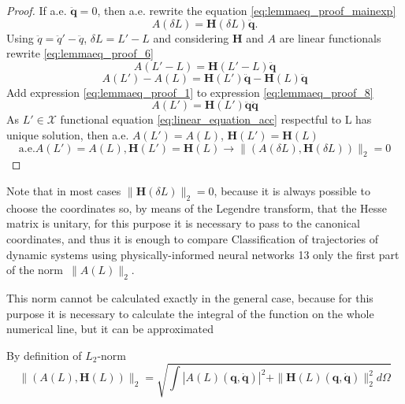 \documentclass[sn-mathphys-num]{sn-jnl}
\theoremstyle{thmstylethree}
\theoremstyle{thmstyletwo}
\theoremstyle{thmstyleone}
\begin{document}
\begin{proof}
If a.e. $\ddot{\mathbf{q}} = 0$, then a.e. rewrite the equation \ref{eq:lemmaeq_proof_mainexp}
\begin{equation}
\label{eq:lemmaeq_proof_6}
A(\delta L) = \mathbf{H}(\delta L)\ddot{\mathbf{q}}.
\end{equation}
Using $\ddot{q} = \ddot{q}' - \ddot{q}$, $\delta L = L' - L$ and considering $\mathbf{H}$ and $A$ are linear functionals rewrite \ref{eq:lemmaeq_proof_6}
\begin{equation}
\label{eq:lemmaeq_proof_7}
A(L' - L) = \mathbf{H}(L' - L)\ddot{\mathbf{q}}
\end{equation}
\begin{equation}
\label{eq:lemmaeq_proof_8}
A(L') - A(L) = \mathbf{H}(L')\ddot{\mathbf{q}} -\mathbf{H}(L)\ddot{\mathbf{q}}
\end{equation}
Add expression \ref{eq:lemmaeq_proof_1} to expression
\ref{eq:lemmaeq_proof_8}
\begin{equation}
\label{eq:lemmaeq_proof_9}
A(L') = \mathbf{H}(L')\ddot{\mathbf{q}}\ddot{\mathbf{q}}
\end{equation}
As $L' \in \mathcal{X}$ functional equation \ref{eq:linear_equation_acc} respectful to L has unique solution, then a.e. $A(L') = A(L)$, $\mathbf{H}(L') = \mathbf{H}(L)$
\begin{equation}
\label{eq:lemmaeq_proof_9}
\text{a.e.} A(L') = A(L), \mathbf{H}(L') = \mathbf{H}(L) \rightarrow \|(A(\delta L), \mathbf{H}(\delta L))\|_2 = 0
\end{equation}

\end{proof}

Note that in most cases $\|\mathbf{H}(\delta L)\|_2 = 0$, because it is always possible to choose the
coordinates so, by means of the Legendre transform, that the Hesse matrix is unitary, for this
purpose it is necessary to pass to the canonical coordinates, and thus it is enough to compare
Classification of trajectories of dynamic systems using physically-informed neural networks 13
only the first part of the norm~$\|A(L)\|_2$.

This norm cannot be calculated exactly in the general case, because for this purpose it is
necessary to calculate the integral of the function on the whole numerical line, but it can be
approximated

By definition of $L_2$-norm
\begin{equation}
\label{eq:l2_norm_approx_1}
\|(A(L), \mathbf{H}(L))\|_2 = \sqrt{\int |A(L)\left(\mathbf{q}, \dot{\mathbf{q}}\right)|^2 + \|\mathbf{H}(L)\left(\mathbf{q}, \dot{\mathbf{q}}\right)\|_2^2  d\Omega} 
\end{equation}
\end{document}

